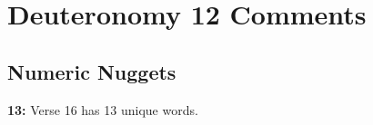 \section{Deuteronomy 12 Comments}

\subsection{Numeric Nuggets}
\textbf{13: } Verse 16 has 13 unique words.